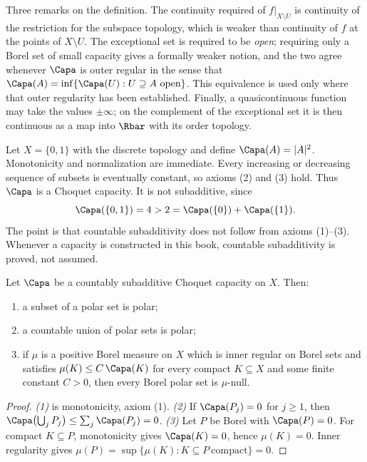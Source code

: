 Three remarks on the definition.  The continuity required of
$f|_{X\setminus U}$ is continuity of the restriction for the subspace
topology, which is weaker than continuity of $f$ at the points of
$X\setminus U$.  The exceptional set is required to be \emph{open}; requiring
only a Borel set of small capacity gives a formally weaker notion, and the two
agree whenever $\Capa$ is outer regular in the sense that
$\Capa(A)=\inf\{\Capa(U):U\supseteq A\ \text{open}\}$.  This equivalence is
used only where that outer regularity has been established.  Finally, a
quasicontinuous function may take the
values $\pm\infty$; on the complement of the exceptional set it is then
continuous as a map into $\Rbar$ with its order topology.

\begin{example}
\label{ex:capacity-not-subadditive}
Let $X=\{0,1\}$ with the discrete topology and define
$\Capa(A)=|A|^2$.  Monotonicity and normalization are immediate.  Every
increasing or decreasing sequence of subsets is eventually constant, so
axioms (2) and (3) hold.  Thus $\Capa$ is a Choquet capacity.  It is not
subadditive, since
\[
 \Capa(\{0,1\})=4>2=\Capa(\{0\})+\Capa(\{1\}).
\]
The point is that countable subadditivity does not follow from axioms
(1)--(3).  Whenever a capacity is
constructed in this book, countable subadditivity is proved, not assumed.
\end{example}

\begin{proposition}
\label{prop:polar-sigma-ideal}
Let $\Capa$ be a countably subadditive Choquet capacity on $X$.  Then:
\begin{enumerate}
\item a subset of a polar set is polar;
\item a countable union of polar sets is polar;
\item if $\mu$ is a positive Borel measure on $X$ which is inner regular on
  Borel sets and satisfies $\mu(K)\leq C\,\Capa(K)$ for every compact
  $K\subseteq X$ and some finite constant $C>0$, then every Borel polar set is
  $\mu$-null.
\end{enumerate}
\par
\end{proposition}

\begin{proof}
\emph{(1)} is monotonicity, axiom (1).  \emph{(2)} If
$\Capa(P_j)=0$ for $j\geq1$, then
$\Capa\bigl(\bigcup_jP_j\bigr)\leq\sum_j\Capa(P_j)=0$.
\emph{(3)} Let $P$ be Borel with $\Capa(P)=0$.  For compact $K\subseteq P$,
monotonicity gives $\Capa(K)=0$, hence $\mu(K)=0$.  Inner regularity gives
$\mu(P)=\sup\{\mu(K):K\subseteq P\ \text{compact}\}=0$.
\end{proof}


